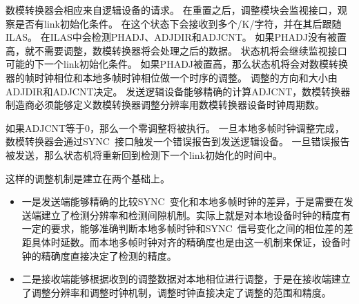 \documentclass[UTF8]{ctexart}
\begin{document}
数模转换器会相应来自逻辑设备的请求。
在重置之后，调整模块会监视接口，观察是否有link初始化条件。
在这个状态下会接收到多个/K/字符，并在其后跟随ILAS。
在ILAS中会检测PHADJ、ADJDIR和ADJCNT。
如果PHADJ没有被置高，就不需要调整，数模转换器将会处理之后的数据。
状态机将会继续监视接口可能的下一个link初始化条件。
如果PHADJ被置高，那么状态机将会对数模转换器的帧时钟相位和本地多帧时钟相位做一个时序的调整。
调整的方向和大小由ADJDIR和ADJCNT决定。
发送逻辑设备能够精确的计算ADJCNT，数模转换器制造商必须能够定义数模转换器调整分辨率用数模转换器设备时钟周期数。

如果ADJCNT等于0，那么一个零调整将被执行。
一旦本地多帧时钟调整完成，数模转换器会通过SYNC~接口触发一个错误报告到发送逻辑设备。
一旦错误报告被发送，那么状态机将重新回到检测下一个link初始化的时间中。

这样的调整机制是建立在两个基础上。

\begin{itemize}
\item 一是发送端能够精确的比较SYNC~变化和本地多帧时钟的差异，于是需要在发送端建立了检测分辨率和检测间隙机制。实际上就是对本地设备时钟的精度有一定的要求，能够准确判断本地多帧时钟和SYNC~信号变化之间的相位差的差距具体时延数。而本地多帧时钟对齐的精确度也是由这一机制来保证，设备时钟的精确度直接决定了检测的精度。
\item 二是接收端能够根据收到的调整数据对本地相位进行调整，于是在接收端建立了调整分辨率和调整时钟机制，调整时钟直接决定了调整的范围和精度。
\end{itemize}


\end{document}
